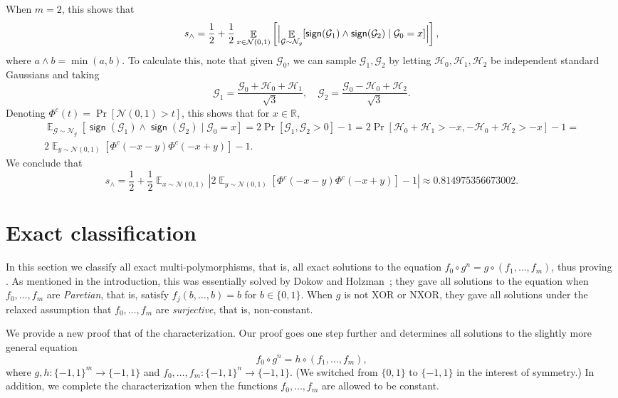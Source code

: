 \documentclass{article}
\theoremstyle{definition}
\theoremstyle{remark}
\DeclareMathOperator*{\E}{\mathbb{E}}
\providecommand{\cG}{\mathcal{G}}
\providecommand{\cH}{\mathcal{H}}
\providecommand{\normal}{\mathcal{N}}
\providecommand{\normalg}[1]{\normal_{#1}}
\providecommand{\stdnormal}{\normal(0,1)}
\DeclareMathOperator{\sgn}{\mathsf{sign}}
\begin{document}
\medskip

When $m = 2$, this shows that
\[
 s_\land = \frac{1}{2} + \frac{1}{2} \E_{x \in \stdnormal} \left[\Bigl| \E_{\cG \sim \normalg{g}}[\sgn(\cG_1) \land \sgn(\cG_2) \mid \cG_0 = x] \Bigr|\right],
\]
where $a \land b = \min(a,b)$.
To calculate this, note that given $\cG_0$, we can sample $\cG_1,\cG_2$ by letting $\cH_0,\cH_1,\cH_2$ be independent standard Gaussians and taking
\[
 \cG_1 = \frac{\cG_0 + \cH_0 + \cH_1}{\sqrt{3}},
 \quad
 \cG_2 = \frac{\cG_0 - \cH_0 + \cH_2}{\sqrt{3}}.
\]
Denoting $\Phi^c(t) = \Pr[\stdnormal > t]$, this shows that for $x \in \mathbb{R}$,
\begin{multline*}
 \E_{\cG \sim \normalg{g}}[\sgn(\cG_1) \land \sgn(\cG_2) \mid \cG_0 = x] =
 2\Pr[\cG_1,\cG_2 > 0] - 1 =
 2\Pr[\cH_0 + \cH_1 > -x, -\cH_0 + \cH_2 > -x] - 1 = \\
 2\E_{y \sim \stdnormal}[\Phi^c(-x-y) \Phi^c(-x+y)] - 1.
\end{multline*}
We conclude that
\[
 s_\land = \frac{1}{2} + \frac{1}{2} \E_{x \sim \stdnormal} \left|
 2\E_{y \sim \stdnormal}[\Phi^c(-x-y) \Phi^c(-x+y)] - 1
 \right| \approx 0.814975356673002.
\]


\section{Exact classification}
\label{sec:exact}

In this section we classify all exact multi-polymorphisms, that is, all exact solutions to the equation \(f_0 \circ g^n = g \circ (f_1,\ldots,f_m)\), thus proving . As mentioned in the introduction, this was essentially solved by Dokow and Holzman~\cite{DH09}; they gave all solutions to the equation when $f_0,\ldots,f_m$ are \emph{Paretian}, that is, satisfy $f_j(b,\ldots,b) = b$ for $b \in \{0,1\}$. When $g$ is not XOR or NXOR, they gave all solutions under the relaxed assumption that $f_0,\ldots,f_m$ are \emph{surjective}, that is, non-constant.

We provide a new proof that of the characterization. Our proof goes one step further and determines all solutions to the slightly more general equation 
\[
 f_0 \circ g^n = h \circ (f_1,\ldots,f_m),
\]
where $g,h \colon \{-1,1\}^m \to \{-1,1\}$ and $f_0,\ldots,f_m \colon \{-1,1\}^n \to \{-1,1\}$.
(We switched from $\{0,1\}$ to $\{-1,1\}$ in the interest of symmetry.)
In addition, we complete the characterization when the functions $f_0,\ldots,f_m$ are allowed to be constant.
\end{document}
